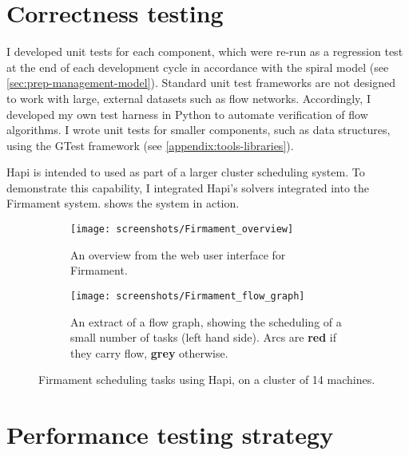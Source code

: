 \section{Correctness testing} \label{sec:eval-test-correctness}



I developed unit tests for each component, which were re-run as a regression test at the end of each development cycle in accordance with the spiral model (see \cref{sec:prep-management-model}). Standard unit test frameworks are not designed to work with large, external datasets such as flow networks. Accordingly, I developed my own test harness in Python to automate verification of flow algorithms. I wrote unit tests for smaller components, such as data structures, using the GTest framework (see \cref{appendix:tools-libraries}).

Hapi is intended to used as part of a larger cluster scheduling system. To demonstrate this capability, I integrated Hapi's solvers integrated into the Firmament system.  shows the system in action.

\begin{figure}
    \begin{subfigure}{\textwidth}
        \texttt{[image: screenshots/Firmament\_overview]}
        \caption{An overview from the web user interface for Firmament.}
    \end{subfigure}
    \begin{subfigure}{\textwidth}
        \texttt{[image: screenshots/Firmament\_flow\_graph]}
        \caption{An extract of a flow graph, showing the scheduling of a small number of tasks (left hand side). Arcs are \textbf{\color{red} red} if they carry flow, \textbf{\color{gray} grey} otherwise.}
    \end{subfigure}
    \caption[Firmament scheduling tasks]{Firmament scheduling tasks using Hapi, on a cluster of 14 machines.}
    \label{fig:firmament-ui}
\end{figure}

\section{Performance testing strategy} \label{sec:eval-benchmark-strategy}

